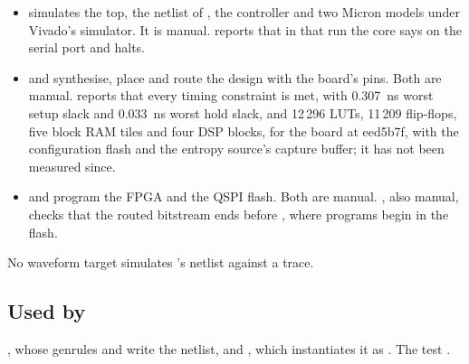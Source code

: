 \begin{itemize}
holds its interrupt controller targets.
\allowbreak
{} has the host port write four bursts of
eight words into the DDR3 under its four identifiers, in flight
together, and read them back: each write is answered once under its
own identifier, and every word comes back in order within its burst
under its burst's identifier, while the core runs its program. \allowbreak
{} has the core hold a DDR3 word's line,
the host write that word, and the core's next read give the new word
(issue 1634).
\allowbreak
{} checks that the Verilog
has the top, the core and the DDR3's pins part as modules,
instantiates  and  without writing
either, and has
the  pads.
\item {} simulates the top, the
netlist of , the controller and two
Micron models under Vivado's simulator. It is manual.
 reports that in that run the core says
 on the serial port and halts.
\item {} and
 synthesise, place and route
the design with the board's pins. Both are manual.
 reports that every timing constraint is met, with
0.307~ns worst setup slack and 0.033~ns worst hold slack, and 12\,296
LUTs, 11\,209 flip-flops, five block RAM tiles and four DSP blocks, for
the board at eed5b7f, with the configuration flash and the entropy
source's capture buffer; it has not been measured since.
\item {} and
 program the FPGA and the
QSPI flash. Both are manual.
, also manual, checks
that the routed bitstream ends before , where
programs begin in the flash.
\end{itemize}

No waveform target simulates 's netlist against a trace.

\subsection*{Used by}

, whose genrules
 and 
write the netlist, and , which instantiates it
as . The test .

